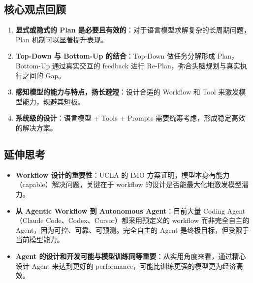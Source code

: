 \documentclass[a4paper]{article}
\begin{document}
\subsection{核心观点回顾}

\begin{enumerate}
    \item \textbf{显式或隐式的 Plan 是必要且有效的}：对于语言模型求解复杂的长周期问题，Plan 机制可以显著提升表现。
    \item \textbf{Top-Down 与 Bottom-Up 的结合}：Top-Down 做任务分解形成 Plan，Bottom-Up 通过真实交互的 feedback 进行 Re-Plan，弥合头脑规划与真实执行之间的 Gap。
    \item \textbf{感知模型的能力与特点，扬长避短}：设计合适的 Workflow 和 Tool 来激发模型能力，规避其短板。
    \item \textbf{系统级的设计}：语言模型 + Tools + Prompts 需要统筹考虑，形成稳定高效的解决方案。
\end{enumerate}

\subsection{延伸思考}

\begin{itemize}
    \item \textbf{Workflow 设计的重要性}：UCLA 的 IMO 方案证明，模型本身有能力（capable）解决问题，关键在于 workflow 的设计是否能最大化地激发模型潜力。
    \item \textbf{从 Agentic Workflow 到 Autonomous Agent}：目前大量 Coding Agent（Claude Code、Codex、Cursor）都采用预定义的 workflow 而非完全自主的 Agent，因为可控、可靠、可预测。完全自主的 Agent 是终极目标，但受限于当前模型能力。
    \item \textbf{Agent 的设计和开发可能与模型训练同等重要}：从实用角度来看，通过精心设计 Agent 来达到更好的 performance，可能比训练更强的模型更为经济高效。
\end{itemize}

\end{document}
